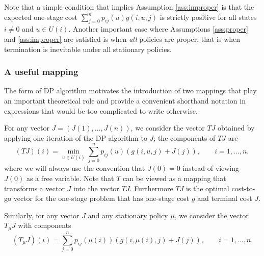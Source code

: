 Note that a simple condition that implies Assumption \ref{ass:improper} is that the expected one-stage cost $\sum^n_{j=0} p_{ij}(u)g(i,u,j)$ is strictly positive for all states $i \neq 0$ and $u \in U(i)$. Another important case where Assumptions \ref{ass:proper} and \ref{ass:improper} are satisfied is when \emph{all} policies are proper, that is when termination is inevitable under all stationary policies.




\subsubsection*{A useful mapping}
The form of DP algorithm motivates the introduction of two mappings that play an important theoretical role and provide a convenient shorthand notation in expressions that would be too complicated to write otherwise.

For any vector $J=(J(1),\ldots,J(n))$, we consider the vector $TJ$ obtained by applying one iteration of the DP algorithm to $J$; the components of $TJ$ are
$$ (TJ)(i) = \min_{u \in U(i)} \sum^n_{j=0} p_{ij}(u) \left( g(i,u,j) + J(j) \right), \qquad i=1,\ldots,n,$$ 
where we will always use the convention that $J(0)=0$ instead of viewing $J(0)$ as a free variable. Note that $T$ can be viewed as a mapping that transforms a vector $J$ into the vector $TJ$. Furthermore $TJ$ is the optimal cost-to-go vector for the one-stage problem that has one-stage cost $g$ and terminal cost $J$.

Similarly, for any vector $J$ and any stationary policy $\mu$, we consider the vector $T_\mu J$ with components
$$ (T_\mu J)(i) = \sum^n_{j=0} p_{ij}\left(\mu(i)\right) \left( g(i,\mu(i),j) + J(j) \right), \qquad i=1,\ldots,n.$$ 

